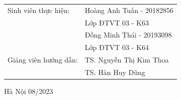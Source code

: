 \begin{titlepage}
\begin{center}
  \begin{table}[H]%
       \centering
       \begin{tabular}{l l}
            \fontsize{14pt}{0pt}\selectfont Sinh viên thực hiện:      & \fontsize{14pt}{0pt}\selectfont Hoàng Anh Tuấn - 20182856\\
              &\fontsize{14pt}{0pt}\selectfont Lớp ĐTVT 03 - K63  \vspace{6pt} \\
              &\fontsize{14pt}{0pt}\selectfont Đồng Minh Thái - 20193098  \\
              &\fontsize{14pt}{0pt}\selectfont Lớp ĐTVT 03 - K64 \vspace{6pt} \\
            \fontsize{14pt}{0pt}\selectfont Giảng viên hướng dẫn: & \fontsize{14pt}{0pt}\selectfont TS. Nguyễn Thị Kim Thoa \\   
              &\fontsize{14pt}{0pt}\selectfont TS. Hàn Huy Dũng \vspace{6pt} \\
       \end{tabular}
  \end{table}
  \vspace{1.3cm} %
  \fontsize{14pt}{0pt}\selectfont Hà Nội 08/2023
  \end{center}
  \end{titlepage}
  
